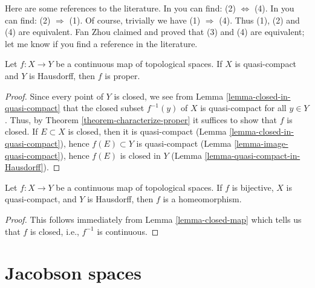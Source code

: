 \begin{remark}
\label{remark-proof-literature}
Here are some references to the literature.
In \cite[I, p. 75, Theorem 1]{Bourbaki} you can find:
(2) $\Leftrightarrow$ (4).
In \cite[I, p. 77, Proposition 6]{Bourbaki} you can find:
(2) $\Rightarrow$ (1).
Of course, trivially we have (1) $\Rightarrow$ (4).
Thus (1), (2) and (4) are equivalent.
Fan Zhou claimed and proved that (3) and (4) are equivalent;
let me know if you find a reference in the literature.
\end{remark}

\begin{lemma}
\label{lemma-closed-map}
Let $f : X \to Y$ be a continuous map of topological spaces.
If $X$ is quasi-compact and $Y$ is Hausdorff, then $f$ is proper.
\end{lemma}

\begin{proof}
Since every point of $Y$ is closed, we see from
Lemma \ref{lemma-closed-in-quasi-compact}
that the closed subset $f^{-1}(y)$ of $X$ is quasi-compact for all $y \in Y$.
Thus, by Theorem \ref{theorem-characterize-proper}
it suffices to show that $f$ is closed.
If $E \subset X$ is closed, then it is quasi-compact
(Lemma \ref{lemma-closed-in-quasi-compact}),
hence $f(E) \subset Y$ is quasi-compact
(Lemma \ref{lemma-image-quasi-compact}),
hence $f(E)$ is closed in $Y$
(Lemma \ref{lemma-quasi-compact-in-Hausdorff}).
\end{proof}

\begin{lemma}
\label{lemma-bijective-map}
Let $f : X \to Y$ be a continuous map of topological spaces.
If $f$ is bijective, $X$ is quasi-compact, and $Y$ is Hausdorff,
then $f$ is a homeomorphism.
\end{lemma}

\begin{proof}
This follows immediately from Lemma \ref{lemma-closed-map}
which tells us that $f$ is closed, i.e., $f^{-1}$ is
continuous.
\end{proof}













\section{Jacobson spaces}
\label{section-space-jacobson}

